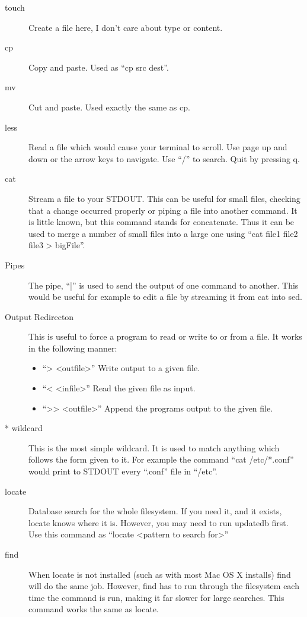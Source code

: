 \begin{description}
			\item[touch]
				Create a file here, I don't care about type or content. 
			\item[cp]
				Copy and paste. Used as ``cp src dest''.
			\item[mv]
				Cut and paste. Used exactly the same as cp. 
			\item[less]
				Read a file which would cause your terminal to scroll. 
				Use page up and down or the arrow keys to navigate. 
				Use ``/'' to search.
				Quit by pressing q.
			\item[cat]
				Stream a file to your STDOUT. 
				This can be useful for small files, checking that a change occurred properly or piping a file into another command. 
				It is little known, but this command stands for concatenate. 
				Thus it can be used to merge a number of small files into a large one using ``cat file1 file2 file3 > bigFile''.
			\item[Pipes]
				The pipe, ``|'' is used to send the output of one command to another. 
				This would be useful for example to edit a file by streaming it from cat into sed. 
			\item[Output Redirecton]
				This is useful to force a program to read or write to or from a file. 
				It works in the following manner:
				\begin{itemize}
					\item ``> <outfile>'' Write output to a given file.
					\item ``< <infile>'' Read the given file as input.
					\item ``>{}> <outfile>'' Append the programs output to the given file. 
				\end{itemize}
			\item[\** wildcard]
				This is the most simple wildcard. 
				It is used to match anything which follows the form given to it. 
				For example the command ``cat /etc/\**.conf'' would print to STDOUT every ``.conf'' file in ``/etc''.
			\item[locate]
				Database search for the whole filesystem. 
				If you need it, and it exists, locate knows where it is. 
				However, you may need to run updatedb first. 
				Use this command as ``locate <pattern to search for>''
			\item[find]
				When locate is not installed (such as with most Mac OS X installs) find will do the same job. 
				However, find has to run through the filesystem each time the command is run, making it far slower for large searches. 
				This command works the same as locate. 

\end{description}
